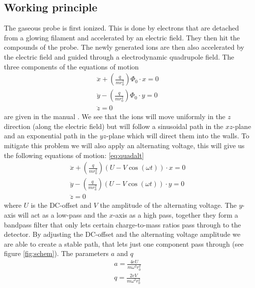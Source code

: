 \subsection{Working principle}
    The gaseous probe is first ionized. This is done by electrons that are detached from a glowing filament and accelerated by an electric field. They then hit the compounds of the probe.  The newly generated ions are then also accelerated by the electric field and guided through a electrodynamic quadrupole field. The three components of the equations of motion 
    \begin{equation}
        \begin{aligned}
            \ddot x + \left(\frac{q}{mr_0^2}\right)\Phi_0\cdot x= 0 \\
            \ddot y - \left(\frac{q}{mr_0^2}\right)\Phi_0\cdot y= 0 \\
            \ddot z = 0 
            \label{eq:quadstatic}
        \end{aligned}
    \end{equation}
    are given in the manual \cite{manual}.
    We see that the ions will move uniformly in the $z$ direction (along the electric field) but will follow a sinusoidal path in the $xz$-plane and an exponential path in the $yz$-plane which will direct them into the walls. To mitigate this problem we will also apply an alternating voltage, this will give us the following equations of motion: \eqref{eq:quadalt}
    \begin{equation}
        \begin{aligned}
            \ddot x + \left(\frac{q}{mr_0^2}\right)(U-V\cos(\omega t))\cdot x= 0 \\
            \ddot y - \left(\frac{q}{mr_0^2}\right)(U-V\cos(\omega t))\cdot y= 0 \\
            \ddot z = 0 
            \label{eq:quadalt}
        \end{aligned}
    \end{equation}
    where $U$ is the DC-offset and $V$ the amplitude of the alternating voltage.
    The $y$-axis will act as a low-pass and the $x$-axis as a high pass, together they form a bandpass filter that only lets certain charge-to-mass ratios pass through to the detector. By adjusting the DC-offset and the alternating voltage amplitude we are able to create a stable path, that lets just one component pass through (see figure \ref{fig:schem}). The parameters $a$ and $q$ 
    \begin{equation}
        \begin{aligned}
            a = \frac{4eU}{m\omega^2r_0^2} \\
            q = \frac{2eV}{m\omega^2r_0^2}
            \label{eq:params}
        \end{aligned}
    \end{equation}
